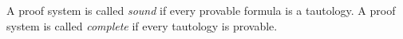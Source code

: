 

\setcounter{section}{2}
\setcounter{subsection}{1}
\setcounter{dfn}{3}

\begin{dfn}
A proof system is called \emph{sound} if every provable formula is a tautology.
A proof system is called \emph{complete} if every tautology is provable.
\end{dfn}

